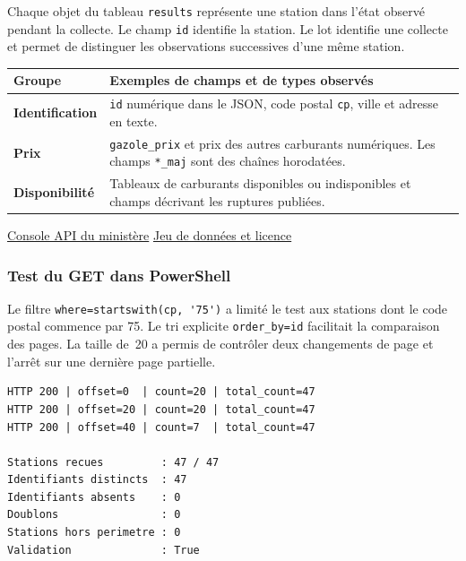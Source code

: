\documentclass[11pt,a4paper]{article}
\newcommand{\code}[1]{\texttt{#1}}
\newcommand{\afficherpowershell}{%
  \par\smallskip
  \begingroup
  \setlength{\fboxsep}{10pt}%
  \noindent\colorbox{psbar}{%
    \makebox[\dimexpr\linewidth-20pt\relax][l]{%
      \color{pstext}\small\sffamily\bfseries PowerShell
      \hfill\mdseries $-$\quad$\times$}}%
  \par\nointerlineskip
  \noindent\colorbox{psbody}{\usebox{\psoutput}}\par
  \endgroup
}
\begin{document}
Chaque objet du tableau \code{results} représente une station dans
l'état observé pendant la collecte. Le champ \code{id} identifie
la station. Le lot identifie une collecte et permet de distinguer
les observations successives d'une même station.

{\small
\begin{tabularx}{\linewidth}{@{}>{\bfseries}p{2.9cm}X@{}}
\toprule
Groupe & Exemples de champs et de types observés \\
\midrule
Identification &
\code{id} numérique dans le JSON, code postal \code{cp}, ville et
adresse en texte. \\
Prix &
\code{gazole\_prix} et prix des autres carburants numériques.
Les champs \code{*\_maj} sont des chaînes horodatées. \\
Disponibilité &
Tableaux de carburants disponibles ou indisponibles et champs
décrivant les ruptures publiées. \\
\bottomrule
\end{tabularx}
}

\href{https://data.economie.gouv.fr/explore/dataset/prix-des-carburants-en-france-flux-instantane-v2/api/}{Console API du ministère}
\quad
\href{https://www.data.gouv.fr/datasets/prix-des-carburants-en-france-flux-instantane-v2-amelioree}{Jeu de données et licence}

\subsubsection{Test du GET dans PowerShell}

Le filtre \verb|where=startswith(cp, '75')| a limité le test aux
stations dont le code postal commence par 75. Le tri explicite
\verb|order_by=id| facilitait la comparaison des pages. La taille
de~20 a permis de contrôler deux changements de page et l'arrêt sur
une dernière page partielle.

\begin{lrbox}{\psoutput}
\begin{minipage}{\dimexpr\linewidth-20pt\relax}
\color{pstext}\small
\begin{Verbatim}
HTTP 200 | offset=0  | count=20 | total_count=47
HTTP 200 | offset=20 | count=20 | total_count=47
HTTP 200 | offset=40 | count=7  | total_count=47

Stations recues         : 47 / 47
Identifiants distincts  : 47
Identifiants absents    : 0
Doublons                : 0
Stations hors perimetre : 0
Validation              : True
\end{Verbatim}
\end{minipage}
\end{lrbox}
\afficherpowershell
\end{document}
